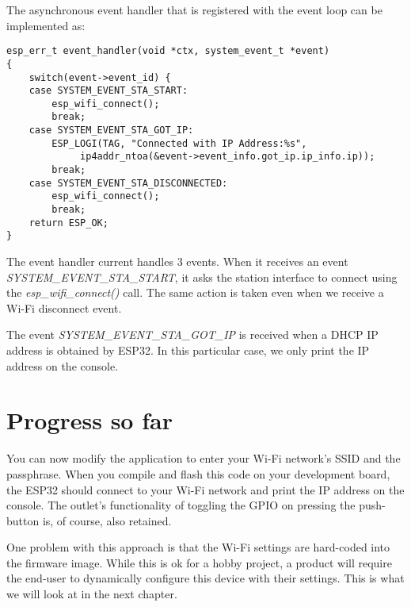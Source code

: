 \documentclass[main.tex]{subfiles}
\begin{document}

The asynchronous event handler that is registered with the event loop can be implemented as:
\begin{verbatim}
esp_err_t event_handler(void *ctx, system_event_t *event)
{
    switch(event->event_id) {
    case SYSTEM_EVENT_STA_START:
        esp_wifi_connect();
        break;
    case SYSTEM_EVENT_STA_GOT_IP:
        ESP_LOGI(TAG, "Connected with IP Address:%s",  
             ip4addr_ntoa(&event->event_info.got_ip.ip_info.ip));
        break;
    case SYSTEM_EVENT_STA_DISCONNECTED:
        esp_wifi_connect();
        break;
    return ESP_OK;
}
\end{verbatim}

The event handler current handles 3 events. When it receives an event \textit{SYSTEM\_EVENT\_STA\_START}, it asks the station interface to connect using the \textit{esp\_wifi\_connect()} call. The same action is taken even when we receive a Wi-Fi disconnect event.

The event \textit{SYSTEM\_EVENT\_STA\_GOT\_IP} is received when a DHCP IP address is obtained by ESP32. In this particular case, we  only print the IP address on the console.

\section{Progress so far}
You can now modify the application to enter your Wi-Fi network's SSID and the passphrase. When you compile and flash this code on your development board, the ESP32 should connect to your Wi-Fi network and print the IP address on the console. The outlet's functionality of toggling the GPIO on pressing the push-button is, of course, also retained.

One problem with this approach is that the Wi-Fi settings are hard-coded into the firmware image. While this is ok for a hobby project, a product will require the end-user to dynamically configure this device with their settings. This is what we will look at in the next chapter.
\end{document}
